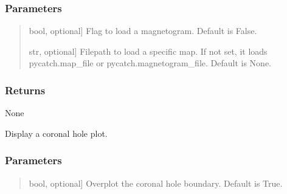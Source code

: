 \documentclass[letterpaper,10pt,english]{sphinxmanual}
\begin{document}
\begin{fulllineitems}
\begin{fulllineitems}
\subsubsection{Parameters}
\label{\detokenize{pycatch/pycatch:id19}}\begin{quote}
\begin{description}
\sphinxlineitem{mag}{[}bool, optional{]}
\sphinxAtStartPar
Flag to load a magnetogram. Default is False.

\sphinxlineitem{file}{[}str, optional{]}
\sphinxAtStartPar
Filepath to load a specific map. If not set, it loads pycatch.map\_file or pycatch.magnetogram\_file. Default is None.

\end{description}
\end{quote}


\subsubsection{Returns}
\label{\detokenize{pycatch/pycatch:id20}}
\sphinxAtStartPar
None

\end{fulllineitems}


\begin{fulllineitems}
\label{\detokenize{pycatch/pycatch:pycatch.pycatch.pycatch.plot_map}}
\pysigstartsignatures
{}
\pysigstopsignatures
\sphinxAtStartPar
Display a coronal hole plot.


\subsubsection{Parameters}
\label{\detokenize{pycatch/pycatch:id21}}\begin{quote}
\begin{description}
\sphinxlineitem{boundary}{[}bool, optional{]}
\sphinxAtStartPar
Overplot the coronal hole boundary. Default is True.


\end{description}
\end{quote}
\end{fulllineitems}
\end{fulllineitems}
\end{document}
